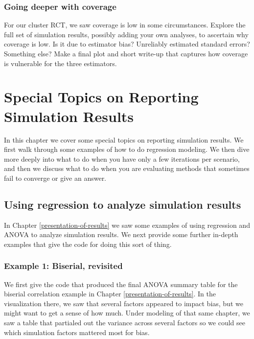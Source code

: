 \documentclass[
]{book}
\begin{document}
\subsection{Going deeper with coverage}\label{going-deeper-with-coverage}

For our cluster RCT, we saw coverage is low in some circumstances.
Explore the full set of simulation results, possibly adding your own analyses, to ascertain why coverage is low.
Is it due to estimator bias? Unreliably estimated standard errors? Something else?
Make a final plot and short write-up that captures how coverage is vulnerable for the three estimators.

\chapter{Special Topics on Reporting Simulation Results}\label{special-topics-on-reporting-simulation-results}

In this chapter we cover some special topics on reporting simulation results.
We first walk through some examples of how to do regression modeling.
We then dive more deeply into what to do when you have only a few iterations per scenario, and then we discuss what to do when you are evaluating methods that sometimes fail to converge or give an answer.

\section{Using regression to analyze simulation results}\label{using-regression-to-analyze-simulation-results}

In Chapter \ref{presentation-of-results} we saw some examples of using regression and ANOVA to analyze simulation results.
We next provide some further in-depth examples that give the code for doing this sort of thing.

\subsection{Example 1: Biserial, revisited}\label{example-1-biserial-revisited-1}

We first give the code that produced the final ANOVA summary table for the biserial correlation example in Chapter \ref{presentation-of-results}.
In the visualization there, we saw that several factors appeared to impact bias, but we might want to get a sense of how much.
Under modeling of that same chapter, we saw a table that partialed out the variance across several factors so we could see which simulation factors mattered most for bias.
\end{document}
